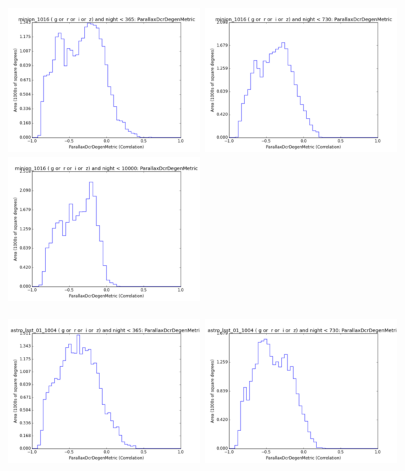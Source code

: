 \begin{figure}[ht]
  \begin{center}
  \includegraphics[width=2.0in]{./figs/milkyway/astromPanels/MW_Astrom_paDcrDegen_Baseline_01y_hst.png}
  \includegraphics[width=2.0in]{./figs/milkyway/astromPanels/MW_Astrom_paDcrDegen_Baseline_02y_hst.png}
  \includegraphics[width=2.0in]{./figs/milkyway/astromPanels/MW_Astrom_paDcrDegen_Baseline_10y_hst.png}
  \end{center}
  \begin{center}
  \includegraphics[width=2.0in]{./figs/milkyway/astromPanels/MW_Astrom_paDcrDegen_wfdPlane_01y_hst.png}
  \includegraphics[width=2.0in]{./figs/milkyway/astromPanels/MW_Astrom_paDcrDegen_wfdPlane_02y_hst.png}

\end{center}
\end{figure}
